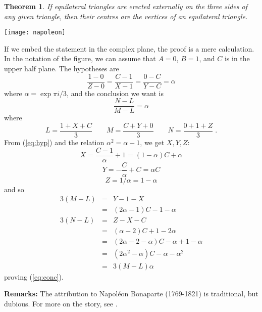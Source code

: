 \documentclass[12pt]{article}
\newtheorem*{thm}{Theorem}
\theoremstyle{definition}
\begin{document}

\begin{thm} 
If equilateral triangles
are erected externally on the three sides of any given triangle, then
their centres are the vertices of an equilateral triangle.
\end{thm}
\begin{center}
\texttt{[image: napoleon]}
\end{center}
If we embed the statement in the complex plane, the proof
is a mere calculation. In the notation
of the figure, we can assume that $A=0$, $B=1$, and
$C$ is in the upper half plane. The hypotheses are
\begin{equation} \label{eq:hyp}
\frac{1-0}{Z-0}=\frac{C-1}{X-1}=\frac{0-C}{Y-C}=\alpha
\end{equation}
where $\alpha=\exp{\pi i/3}$, and the conclusion we want is
\begin{equation} \label{eq:conc}
\frac{N-L}{M-L}=\alpha
\end{equation}
where
$$L=\frac{1+X+C}{3}\qquad M=\frac{C+Y+0}{3}\qquad N=\frac{0+1+Z}{3}\;.$$
From (\ref{eq:hyp}) and the relation $\alpha^2=\alpha-1$, we get $X,Y,Z$:
$$X=\frac{C-1}{\alpha}+1=(1-\alpha)C+\alpha$$
$$Y=-\frac{C}{\alpha}+C=\alpha C$$
$$Z=1/{\alpha}=1-\alpha$$
and so
\begin{eqnarray*}
3(M-L)&=&Y-1-X\\
&=&(2\alpha-1)C-1-\alpha\\
3(N-L)&=&Z-X-C\\
&=&(\alpha-2)C+1-2\alpha\\
&=&(2\alpha-2-\alpha)C-\alpha+1-\alpha\\
&=&(2\alpha^2-\alpha)C-\alpha-\alpha^2\\
&=&3(M-L)\alpha
\end{eqnarray*}
proving (\ref{eq:conc}).

\textbf{Remarks:} The attribution to Napol\'eon Bonaparte (1769-1821) is
traditional, but dubious. For more on the story, see
.
\end{document}
